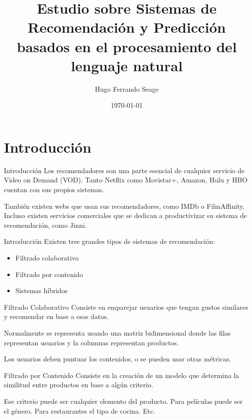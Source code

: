\documentclass[table]{beamer}
\title{Estudio sobre Sistemas de Recomendación y Predicción basados en el procesamiento del lenguaje natural}
\date{\today}
\author{Hugo Ferrando Seage}
\institute{Universidad Europea de Madrid\\Escuela de Arquitectura, Ingeniería y Diseño}
\begin{document}
  \maketitle

  \section{Introducción}
  \begin{frame}{Introducción}
      Los recomendadores son una parte esencial de cualquier servicio de Video on Demand (VOD). Tanto Netflix como Movistar+, Amazon, Hulu y HBO cuentan con sus propios sistemas.

      También existen webs que usan sus recomendadores, como IMDb o FilmAffinity. Incluso existen servicios comerciales que se dedican a productivizar su sistema de recomendación, como Jinni.
  \end{frame}

  \begin{frame}{Introducción}
      Existen tres grandes tipos de sistemas de recomendación:
      \begin{itemize}
          \item Filtrado colaborativo
          \item Filtrado por contenido
          \item Sistemas híbridos
      \end{itemize}
  \end{frame}

  \begin{frame}{Filtrado Colaborativo}
      Consiste en emparejar usuarios que tengan gustos similares y recomendar en base a esos datos.

      Normalmente se representa usando una matriz bidimensional donde las filas representan usuarios y la columnas representan productos.

      Los usuarios deben puntuar los contenidos, o se pueden usar otras métricas.
  \end{frame}

  \begin{frame}{Filtrado por Contenido}
      Consiste en la creación de un modelo que determina la similitud entre productos en base a algún criterio.

      Ese criterio puede ser cualquier elemento del producto. Para películas puede ser el género. Para restaurantes el tipo de cocina. Etc.
  \end{frame}
\end{document}
